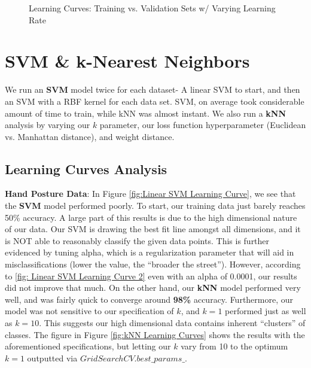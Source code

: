 \documentclass[letterpaper,12pt]{article}
\begin{document}
\begin{figure} %
  \centering
  \hspace{8pt}%
  \caption{Learning Curves:  Training vs. Validation Sets w/ Varying Learning Rate}\label{fig:Boosting Model Complexity Curves}
\end{figure}


\section{SVM \& k-Nearest Neighbors}
We run an \textbf{SVM} model twice for each dataset- A linear SVM to start, and then an SVM with a RBF kernel for each data set. SVM, on average took considerable amount of time to train, while kNN was almost instant.  We also run a \textbf{kNN} analysis by varying our $k$ parameter, our loss function hyperparameter (Euclidean vs. Manhattan distance), and weight distance.  

\subsection{Learning Curves Analysis}

\textbf{Hand Posture Data}:
In Figure \ref{fig:Linear SVM Learning Curve}, we see that the \textbf{SVM} model performed poorly.  To start, our training data just barely reaches 50\% accuracy.  A large part of this results is due to the high dimensional nature of our data.  Our SVM is drawing the best fit line amongst all dimensions, and it is NOT able to reasonably classify the given data points.  This is further evidenced by tuning alpha, which is a regularization parameter that will aid in misclassifications (lower the value, the ``broader the street'').  However, according to \ref{fig: Linear SVM Learning Curve 2} even with an alpha of 0.0001, our results did not improve that much.  On the other hand, our \textbf{kNN} model performed very well, and was fairly quick to converge around \textbf{98\%} accuracy.  Furthermore, our model was not sensitive to our specification of $k$, and $k=1$ performed just as well as $k=10$.  This suggests our high dimensional data contains inherent ``clusters'' of classes.  The figure in Figure \ref{fig:kNN Learning Curves} shows the results with the aforementioned specifications, but letting our $k$ vary from 10 to the optimum $k=1$ outputted via $GridSearchCV.best\_params\_$.
\end{document}
